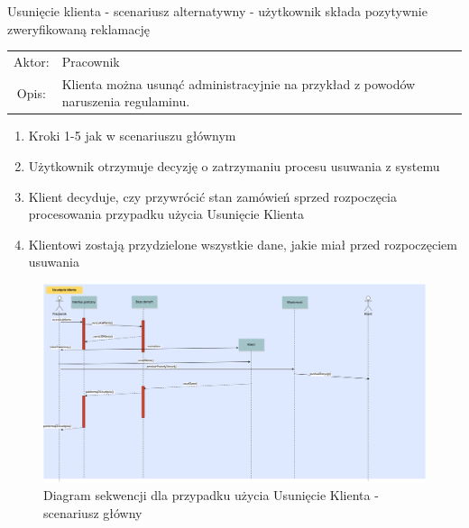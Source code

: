   
  \item Usunięcie klienta - scenariusz alternatywny - użytkownik składa
  pozytywnie zweryfikowaną reklamację
  \\
  \begin{tabularx}{\linewidth}{ c X }
  Aktor: & Pracownik \\
  Opis: & Klienta można usunąć administracyjnie na przykład z powodów
  naruszenia regulaminu.\\
  \end{tabularx}
  \begin{enumerate}
    \item Kroki 1-5 jak w scenariuszu głównym
    \item Użytkownik otrzymuje decyzję o zatrzymaniu procesu usuwania z systemu
    \item Klient decyduje, czy przywrócić stan zamówień sprzed rozpoczęcia
    procesowania przypadku użycia Usunięcie Klienta
    \item Klientowi zostają przydzielone wszystkie dane, jakie miał przed
    rozpoczęciem usuwania
  \end{enumerate}
  
  
  
  
  \begin{figure}[H]
    \includegraphics[width=\textwidth,
    height=0.5\textheight]{graphics/UseCase/Klient/UsuniecieKlientaSD.png}
  \caption{Diagram sekwencji dla przypadku użycia Usunięcie Klienta -
  scenariusz główny}
\end{figure}